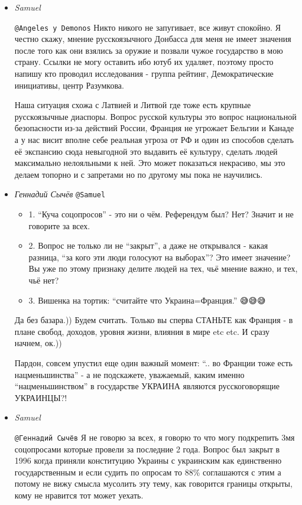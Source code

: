 \begin{itemize}
\begin{itemize}
\item \emph{Samuel}

\verb|@Angeles y Demonos|  Никто никого не запугивает, все живут спокойно. Я
честно скажу, мнение русскоязычного Донбасса для меня не имеет значения после
того как они взялись за оружие и позвали чужое государство в мою страну. Ссылки
не могу оставить ибо ютуб их удаляет, поэтому просто напишу кто проводил
исследования - группа рейтинг, Демократические инициативы, центр Разумкова. 

Наша ситуация схожа с Латвией и Литвой где тоже есть крупные русскоязычные
диаспоры. Вопрос русской культуры это вопрос национальной безопасности из-за
действий России, Франция не угрожает Бельгии и Канаде а у нас висит вполне себе
реальная угроза от РФ и один из способов сделать её экспансию сюда невыгодной
это выдавить её культуру, сделать людей максимально нелояльными к ней. Это
может показаться некрасиво, мы это делаем топорно и с запретами но по другому
мы пока не научились.

\item \emph{Геннадий Сычёв}
 \verb|@Samuel|

\begin{itemize}
\item 1. \enquote{Куча соцопросов} - это ни о чём. Референдум был? Нет? Значит и не говорите за всех.
\item 2. Вопрос не только ли не \enquote{закрыт}, а даже не открывался - какая разница, \enquote{за
кого эти люди голосуют на выборах}? Это имеет значение? Вы уже по этому
признаку делите людей  на тех, чьё мнение важно, и тех, чьё нет?
\item 3. Вишенка на тортик: \enquote{считайте что Украина=Франция.} 😅😅😅
\end{itemize}

Да без базара.)) Будем считать. Только вы сперва СТАНЬТЕ как Франция - в плане
свобод, доходов, уровня жизни, влияния в мире etc etc. И сразу начнем, ок.))

Пардон, совсем упустил еще один важный момент: \enquote{.. во Франции тоже есть
нацменьшинства} - а не подскажете, уважаемый, каким именно \enquote{нацменьшинством}
в государстве УКРАИНА являются русскоговорящие УКРАИНЦЫ?!

\item \emph{Samuel}

\verb|@Геннадий Сычёв|  Я не говорю за всех, я говорю то что могу подкрепить
3мя соцопросами которые провели за последние 2 года. Вопрос был закрыт в 1996
когда приняли конституцию Украины с украинским как единственно государственным
и если судить по опросам то 88\% соглашаются с этим а потому не вижу смысла
мусолить эту тему, как говорится границы открыты, кому не нравится тот может
уехать. 


\end{itemize}
\end{itemize}
